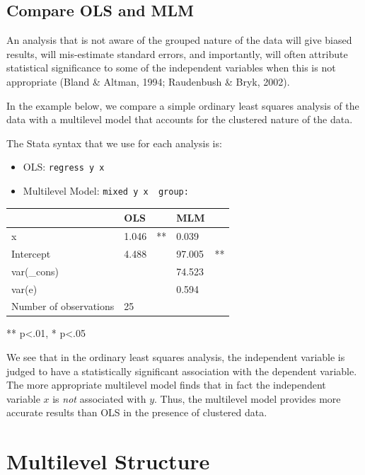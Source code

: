 \documentclass[
  letterpaper,
  DIV=11,
  numbers=noendperiod]{scrreprt}
\providecommand{\tightlist}{%
  \setlength{\itemsep}{0pt}\setlength{\parskip}{0pt}}\usepackage{longtable,booktabs,array}
\begin{document}
\subsection{Compare OLS and MLM}\label{compare-ols-and-mlm}

An analysis that is not aware of the grouped nature of the data will
give biased results, will mis-estimate standard errors, and importantly,
will often attribute statistical significance to some of the independent
variables when this is not appropriate (Bland \& Altman, 1994;
Raudenbush \& Bryk, 2002).

In the example below, we compare a simple ordinary least squares
analysis of the data with a multilevel model that accounts for the
clustered nature of the data.

The Stata syntax that we use for each analysis is:

\begin{itemize}
\tightlist
\item
  OLS: \texttt{regress\ y\ x}
\item
  Multilevel Model: \texttt{mixed\ y\ x\ \textbar{}\textbar{}\ group:}
\end{itemize}

\begin{longtable}[]{@{}lllll@{}}
\toprule\noalign{}
& OLS & & MLM & \\
\midrule\noalign{}
\endhead
\bottomrule\noalign{}
\endlastfoot
x & 1.046 & ** & 0.039 & \\
Intercept & 4.488 & & 97.005 & ** \\
var(\_cons) & & & 74.523 & \\
var(e) & & & 0.594 & \\
Number of observations & 25 & & & \\
\end{longtable}

** p\textless.01, * p\textless.05

We see that in the ordinary least squares analysis, the independent
variable is judged to have a statistically significant association with
the dependent variable. The more appropriate multilevel model finds that
in fact the independent variable \(x\) is \emph{not} associated with
\(y\). Thus, the multilevel model provides more accurate results than
OLS in the presence of clustered data.

\section{Multilevel Structure}\label{sec-multilevelstructure}
\end{document}
